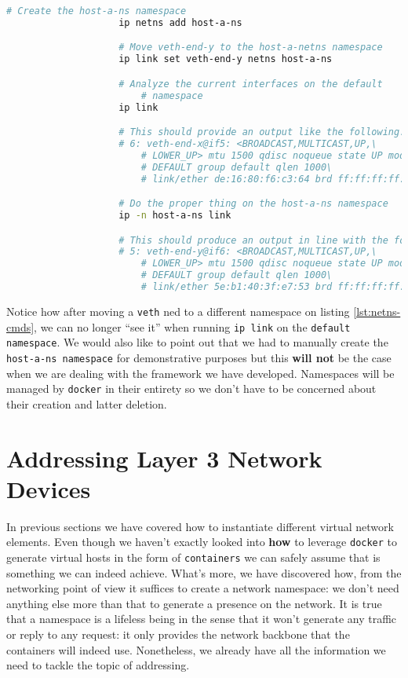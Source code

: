                 \begin{lstlisting}[language = bash, caption = Running \texttt{ip} on a different namespace., label = lst:netns-cmds]
                    # Create the host-a-ns namespace
                    ip netns add host-a-ns

                    # Move veth-end-y to the host-a-netns namespace
                    ip link set veth-end-y netns host-a-ns

                    # Analyze the current interfaces on the default
                        # namespace
                    ip link

                    # This should provide an output like the following:
                    # 6: veth-end-x@if5: <BROADCAST,MULTICAST,UP,\
                        # LOWER_UP> mtu 1500 qdisc noqueue state UP mode\
                        # DEFAULT group default qlen 1000\
                        # link/ether de:16:80:f6:c3:64 brd ff:ff:ff:ff:ff:ff

                    # Do the proper thing on the host-a-ns namespace
                    ip -n host-a-ns link

                    # This should produce an output in line with the following:
                    # 5: veth-end-y@if6: <BROADCAST,MULTICAST,UP,\
                        # LOWER_UP> mtu 1500 qdisc noqueue state UP mode\
                        # DEFAULT group default qlen 1000\
                        # link/ether 5e:b1:40:3f:e7:53 brd ff:ff:ff:ff:ff:ff
                \end{lstlisting}

                Notice how after moving a \texttt{veth} ned to a different namespace on listing \ref{lst:netns-cmds}, we can no longer ``see it'' when running \texttt{ip link} on the \texttt{default namespace}. We would also like to point out that we had to manually create the \texttt{host-a-ns namespace} for demonstrative purposes but this \textbf{will not} be the case when we are dealing with the framework we have developed. Namespaces will be managed by \texttt{docker} in their entirety so we don't have to be concerned about their creation and latter deletion.

    \section{Addressing Layer 3 Network Devices}
        In previous sections we have covered how to instantiate different virtual network elements. Even though we haven't exactly looked into \textbf{how} to leverage \texttt{docker} to generate virtual hosts in the form of \texttt{containers} we can safely assume that is something we can indeed achieve. What's more, we have discovered how, from the networking point of view it suffices to create a network namespace: we don't need anything else more than that to generate a presence on the network. It is true that a namespace is a lifeless being in the sense that it won't generate any traffic or reply to any request: it only provides the network backbone that the containers will indeed use. Nonetheless, we already have all the information we need to tackle the topic of addressing.

